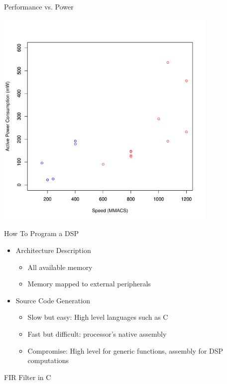 \documentclass{beamer}
\begin{document}
\begin{frame}{Performance vs. Power}
    \begin{center}
        \includegraphics[width=0.8\textwidth]{power_perf.pdf}
    \end{center}
\end{frame}

\begin{frame}{How To Program a DSP}
    \begin{itemize}
        \item Architecture Description
            \begin{itemize}
                \item All available memory
                \item Memory mapped to external peripherals
            \end{itemize}
        \item Source Code Generation
            \begin{itemize}
                \item Slow but easy: High level languages such as C
                \item Fast but difficult: processor's native assembly
                \item Compromise: High level for generic functions, assembly for DSP computations
            \end{itemize}
    \end{itemize}
\end{frame}

\begin{frame}{FIR Filter in C}
    \begin{center}
        {\tiny
            
        }
    \end{center}
\end{frame}
\end{document}
